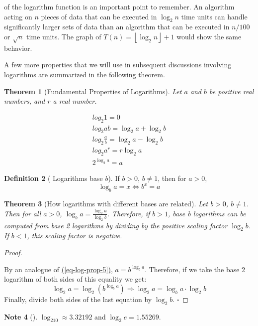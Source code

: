 \documentclass[10pt,]{book}
\theoremstyle{plain}
\newtheorem{theorem}{Theorem}[section]
\theoremstyle{definition}
\newtheorem{definition}[theorem]{Definition}
\theoremstyle{definition}
\newtheorem{note}[theorem]{Note}
\theoremstyle{definition}
\theoremstyle{definition}
\numberwithin{equation}{section}
\begin{document}
of the logarithm function is an important point to remember. An algorithm acting on \(n\) pieces of data that can be executed in \(\log_2{n}\)
time units can handle significantly larger sets of data than an algorithm that can be executed in \(n/100\) or  \(\sqrt{n}\) time units. The graph of \(T(n)=\left\lfloor \log_2n\right\rfloor +1\) would show the same behavior.%
\par
A few more properties that we will use in subsequent discussions involving logarithms are summarized in the following theorem.%
\begin{theorem}[Fundamental Properties of Logarithms]\label{theorem-log-properties}
Let \(a\) and \(b\) be positive real numbers, and \(r\) a real number.

\begin{gather}
log_2 1 = 0\label{eq-log-prop-1}\\
log_2 a b = \log_2a + \log_2b\label{eq-log-prop-2}\\
log_2 \frac{a}{b}= \log_2a - \log_2b\label{eq-log-prop-3}\\
log_2a^r = r \log_2a\label{eq-log-prop-4}\\
2^{\log_2a}= a\label{eq-log-prop-5}
\end{gather}
%
\end{theorem}
\begin{definition}[ Logarithms base \(b\)]\label{def-logarithm-general-base}
\label{notation-1}
If \(b > 0\), \(b \neq 1\), then for \(a>0\), 
 \[\log_b a = x\Leftrightarrow b^x= a\]%
\end{definition}
\begin{theorem}[How logarithms with different bases are related]\label{theorem-logs-related}
Let \(b>0\), \(b \neq 1\). Then for all \(a >0\), \(\log_b a = \frac{\log_2a}{\log_2b}\). Therefore, if \(b > 1\), base b logarithms can be computed from base 2 logarithms by dividing by the positive scaling factor \(\log_2b\). { }If \(b < 1\), this scaling factor is negative.%
\end{theorem}
\begin{proof}\hypertarget{proof-1}{}
By an analogue of \hyperref[eq-log-prop-5]{(\ref{eq-log-prop-5})}, \(a=b^{\log_b a}\). Therefore, if we take the base 2 logarithm of both sides of this equality we get:
\begin{equation*}\log_2 a = \log_2 \left(b^{\log_b a}\right)  \Rightarrow \log_2 a =\log_b a \cdot \log_2 b\end{equation*}
Finally, divide both sides of the last equation by \(\log_2b\). \(\square\)%
\end{proof}
\begin{note}[]\label{note-2}
 \(\log_210 \approx  3.32192\) and \(\log_2e = 1.55269\).%
\end{note}
\typeout{************************************************}
\typeout{************************************************}
\end{document}
